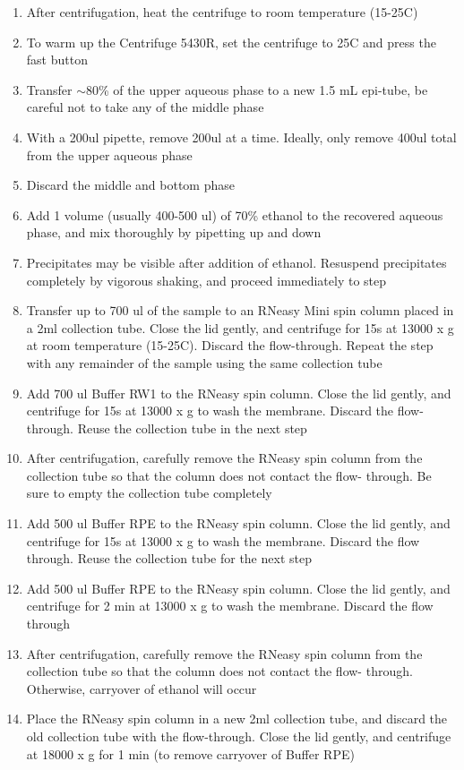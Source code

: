\documentclass[11pt, oneside]{article}
\begin{document}
\begin{enumerate}
			\item After centrifugation, heat the centrifuge to room temperature (15-25C) 
			\item To warm up the Centrifuge 5430R, set the centrifuge to 25C and press the fast button
			\item Transfer $\sim$80\% of the upper aqueous phase to a new 1.5 mL epi-tube, be careful not to take any of the middle phase
			\item With a 200ul pipette, remove 200ul at a time. Ideally, only remove 400ul total from the upper aqueous phase 
			\item Discard the middle and bottom phase
			\item Add 1 volume (usually 400-500 ul) of 70\% ethanol to the recovered aqueous phase, and mix thoroughly by pipetting up and down
			\item Precipitates may be visible after addition of ethanol. Resuspend precipitates completely by vigorous shaking, and proceed immediately 			to step 
			\item Transfer up to 700 ul of the sample to an RNeasy Mini spin column placed in a 2ml collection tube. Close the lid gently, and centrifuge 			for 15s at 13000 x g at room temperature (15-25C). Discard the flow-through. Repeat the step with any remainder of the sample using the 			same collection tube
			\item Add 700 ul Buffer RW1 to the RNeasy spin column. Close the lid gently, and centrifuge for 15s at 13000 x g to wash the membrane. 			Discard the flow-through. Reuse the collection tube in the next step
			\item After centrifugation, carefully remove the RNeasy spin column from the collection tube so that the column does not contact the flow-				through. Be sure to empty the collection tube completely
			\item Add 500 ul Buffer RPE to the RNeasy spin column. Close the lid gently, and centrifuge for 15s at 13000 x g to wash the membrane. 				Discard the flow through. Reuse the collection tube for the next step
			\item Add 500 ul Buffer RPE to the RNeasy spin column. Close the lid gently, and centrifuge for 2 min at 13000 x g to wash the membrane. 			Discard the flow through
			\item After centrifugation, carefully remove the RNeasy spin column from the collection tube so that the column does not contact the flow-				through. Otherwise, carryover of ethanol will occur
			\item Place the RNeasy spin column in a new 2ml collection tube, and discard the old collection tube with the flow-through. Close the lid 				gently, and centrifuge at 18000 x g for 1 min (to remove carryover of Buffer RPE)

\end{enumerate}
\end{document}
